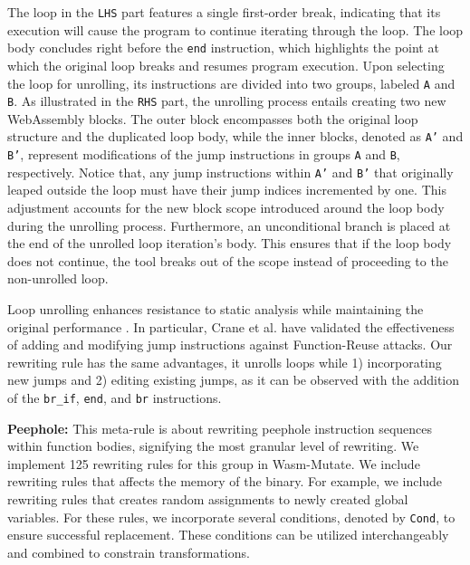 \documentclass[a4paper,fleqn]{cas-dc}
\newcommand{\tool}{{\sc Wasm-Mutate}\xspace}
\begin{document}
The loop in the \texttt{LHS} part features a single first-order break, indicating that its execution will cause the program to continue iterating through the loop. 
The loop body concludes right before the \texttt{end} instruction, which highlights the point at which the original loop breaks and resumes program execution.
Upon selecting the loop for unrolling, its instructions are divided into two groups, labeled \texttt{A} and \texttt{B}. 
As illustrated in the \texttt{RHS} part, the unrolling process entails creating two new WebAssembly blocks. 
The outer block encompasses both the original loop structure and the duplicated loop body, while the inner blocks, denoted as \texttt{A'} and \texttt{B'}, represent modifications of the jump instructions in groups \texttt{A} and \texttt{B}, respectively.
Notice that, any jump instructions within \texttt{A'} and \texttt{B'} that originally leaped outside the loop must have their jump indices incremented by one. 
This adjustment accounts for the new block scope introduced around the loop body during the unrolling process. 
Furthermore, an unconditional branch is placed at the end of the unrolled loop iteration's body. 
This ensures that if the loop body does not continue, the tool breaks out of the scope instead of proceeding to the non-unrolled loop.


Loop unrolling enhances resistance to static analysis while maintaining the original performance \cite{10.1145/3453483.3454035}. 
In particular, Crane et al. \cite{10.1145/2810103.2813682} have validated the effectiveness of adding and modifying jump instructions against Function-Reuse attacks.
Our rewriting rule has the same advantages, it unrolls loops while 1) incorporating new jumps and 2) editing existing jumps, as it can be observed with the addition of the \texttt{br_if}, \texttt{end}, and \texttt{br} instructions. 



\textbf{Peephole:} 
This meta-rule is about rewriting peephole instruction sequences within function bodies, signifying the most granular level of rewriting. 
We implement 125 rewriting rules for this group in \tool. 
We include rewriting rules that affects the memory of the binary.
For example, we include rewriting rules that creates random assignments to newly created global variables.
For these rules, we incorporate several conditions, denoted by \texttt{Cond}, to ensure successful replacement. 
These conditions can be utilized interchangeably and combined to constrain transformations.
\end{document}
